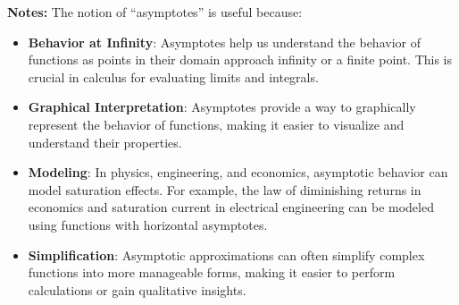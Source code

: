 \begin{tcolorbox}[colback=mylightblue, title = {\bf Asymptotes come in two Flavors: Horizontal and Vertical}, breakable]
\begin{definition}
\end{definition}

\bigskip

\textbf{Notes:} The notion of ``asymptotes'' is useful because:

\begin{itemize}
    \item \textbf{Behavior at Infinity}: Asymptotes help us understand the behavior of functions as points in their domain approach infinity or a finite point. This is crucial in calculus for evaluating limits and integrals.   

    \item \textbf{Graphical Interpretation}: Asymptotes provide a way to graphically represent the behavior of functions, making it easier to visualize and understand their properties.
     
    \item \textbf{Modeling}: In physics, engineering, and economics, asymptotic behavior can model saturation effects. For example, the law of diminishing returns in economics and saturation current in electrical engineering can be modeled using functions with horizontal asymptotes.
    
    \item \textbf{Simplification}: Asymptotic approximations can often simplify complex functions into more manageable forms, making it easier to perform calculations or gain qualitative insights. 
    
\end{itemize}
\end{tcolorbox}


\bigskip

\begin{center}
\setlength{\fboxrule}{2pt}  %
\end{center}

\bigskip

